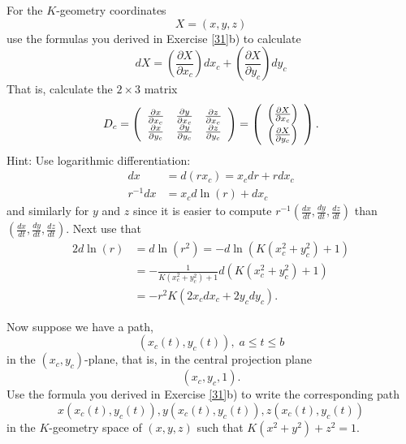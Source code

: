 \documentclass{ximera}
\begin{document}
\begin{exercise}
\label{33}For the $K$-geometry coordinates%
\[
X=\left(  x,y,z\right)
\]
use the formulas you derived in Exercise \ref{31}b) to calculate%
\[
dX=\left(  \frac{\partial X}{\partial x_{c}}\right)  dx_{c}+\left(
\frac{\partial X}{\partial y_{c}}\right)  dy_{c}%
\]
That is, calculate the $2\times3$ matrix%
\[
D_{c}=\left(
\begin{array}
[c]{ccc}%
\frac{\partial x}{\partial x_{c}} & \frac{\partial y}{\partial x_{c}} &
\frac{\partial z}{\partial x_{c}}\\
\frac{\partial x}{\partial y_{c}} & \frac{\partial y}{\partial y_{c}} &
\frac{\partial z}{\partial y_{c}}%
\end{array}
\right)  =\left(
\begin{array}
[c]{c}%
\left(  \frac{\partial X}{\partial x_{c}}\right) \\
\left(  \frac{\partial X}{\partial y_{c}}\right)
\end{array}
\right)  .
\]
Hint: Use logarithmic differentiation:%
\begin{align*}
dx  &  =d\left(  rx_{c}\right)  =x_{c}dr+rdx_{c}\\
r^{-1}dx  &  =x_{c}d\ln\left(  r\right)  +dx_{c}%
\end{align*}
and similarly for $y$ and $z$ since it is easier to compute $r^{-1}\left(
\frac{dx}{dt},\frac{dy}{dt},\frac{dz}{dt}\right)  $ than $\left(  \frac
{dx}{dt},\frac{dy}{dt},\frac{dz}{dt}\right)  $. Next use that%
\begin{align*}
2d\ln\left(  r\right)   &  =d\ln\left(  r^{2}\right)
=-d\ln\left(  K\left(  x_{c}^{2}+y_{c}^{2}\right)  +1\right) \\
&  =-\frac{1}{K\left(  x_{c}^{2}+y_{c}^{2}\right)  +1}d\left(  K\left(
x_{c}^{2}+y_{c}^{2}\right)  +1\right) \\
&  =-r^{2}K\left(  2x_{c}dx_{c}+2y_{c}dy_{c}\right)  .
\end{align*}

\end{exercise}

\begin{exercise}
\label{prev}Now suppose we have a path,%
\[
\left(  x_{c}\left(  t\right)  ,y_{c}\left(  t\right)  \right)  ,\;a\leq t\leq
b
\]
in the $\left(  x_{c},y_{c}\right)  $-plane, that is, in the central
projection plane%
\[
\left(  x_{c},y_{c},1\right)  .
\]
Use the formula you derived in Exercise \ref{31}b) to write the corresponding
path%
\[
x\left(  x_{c}\left(  t\right)  ,y_{c}\left(  t\right)  \right)  ,y\left(
x_{c}\left(  t\right)  ,y_{c}\left(  t\right)  \right)  ,z\left(  x_{c}\left(
t\right)  ,y_{c}\left(  t\right)  \right)
\]
in the $K$-geometry space of $\left(  x,y,z\right)  $ such that $K\left(
x^{2}+y^{2}\right)  +z^{2}=1$.
\end{exercise}
\end{document}

